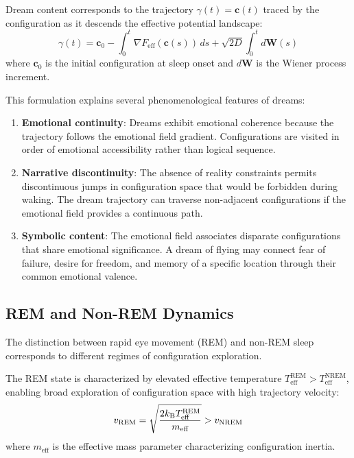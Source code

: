\begin{theorem}
\label{thm:dream_content}
Dream content corresponds to the trajectory $\gamma(t) = \mathbf{c}(t)$ traced by the configuration as it descends the effective potential landscape:
\begin{equation}
\gamma(t) = \mathbf{c}_0 - \int_0^t \nabla F_{\text{eff}}(\mathbf{c}(s)) \, ds + \sqrt{2D} \int_0^t d\mathbf{W}(s)
\label{eq:dream_trajectory}
\end{equation}
where $\mathbf{c}_0$ is the initial configuration at sleep onset and $d\mathbf{W}$ is the Wiener process increment.
\end{theorem}

This formulation explains several phenomenological features of dreams:

\begin{enumerate}
\item \textbf{Emotional continuity}: Dreams exhibit emotional coherence because the trajectory follows the emotional field gradient. Configurations are visited in order of emotional accessibility rather than logical sequence.

\item \textbf{Narrative discontinuity}: The absence of reality constraints permits discontinuous jumps in configuration space that would be forbidden during waking. The dream trajectory can traverse non-adjacent configurations if the emotional field provides a continuous path.

\item \textbf{Symbolic content}: The emotional field associates disparate configurations that share emotional significance. A dream of flying may connect fear of failure, desire for freedom, and memory of a specific location through their common emotional valence.
\end{enumerate}

\subsection{REM and Non-REM Dynamics}

The distinction between rapid eye movement (REM) and non-REM sleep corresponds to different regimes of configuration exploration.

\begin{definition}
\label{def:rem_state}
The REM state is characterized by elevated effective temperature $T_{\text{eff}}^{\text{REM}} > T_{\text{eff}}^{\text{NREM}}$, enabling broad exploration of configuration space with high trajectory velocity:
\begin{equation}
v_{\text{REM}} = \sqrt{\frac{2k_{\mathrm{B}} T_{\text{eff}}^{\text{REM}}}{m_{\text{eff}}}} > v_{\text{NREM}}
\label{eq:rem_velocity}
\end{equation}
where $m_{\text{eff}}$ is the effective mass parameter characterizing configuration inertia.
\end{definition}

